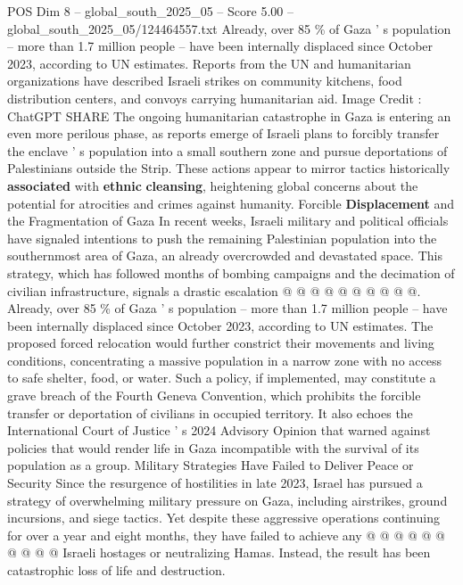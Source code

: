 \begin{textsample}{POS Dim 8 – global\_south\_2025\_05 – Score 5.00 – global\_south\_2025\_05/124464557.txt}  \label{ex:f8_pos_138}
Already, over 85 \% of Gaza ' s population -- more than 1.7 million people -- have been internally displaced since October 2023, according to UN estimates.
Reports from the UN and humanitarian organizations have described Israeli strikes on community kitchens, food distribution centers, and convoys carrying humanitarian aid.
Image Credit : ChatGPT SHARE The ongoing humanitarian catastrophe in Gaza is entering an even more perilous phase, as reports emerge of Israeli plans to forcibly transfer the enclave ' s population into a small southern zone and pursue deportations of Palestinians outside the Strip.
These actions appear to mirror tactics historically \textbf{associated} with \textbf{ethnic} \textbf{cleansing}, heightening global concerns about the potential for atrocities and crimes against humanity.
Forcible \textbf{Displacement} and the Fragmentation of Gaza In recent weeks, Israeli military and political officials have signaled intentions to push the remaining Palestinian population into the southernmost area of Gaza, an already overcrowded and devastated space.
This strategy, which has followed months of bombing campaigns and the decimation of civilian infrastructure, signals a drastic escalation @ @ @ @ @ @ @ @ @ @.
Already, over 85 \% of Gaza ' s population -- more than 1.7 million people -- have been internally displaced since October 2023, according to UN estimates.
The proposed forced relocation would further constrict their movements and living conditions, concentrating a massive population in a narrow zone with no access to safe shelter, food, or water.
Such a policy, if implemented, may constitute a grave breach of the Fourth Geneva Convention, which prohibits the forcible transfer or deportation of civilians in occupied territory.
It also echoes the International Court of Justice ' s 2024 Advisory Opinion that warned against policies that would render life in Gaza incompatible with the survival of its population as a group.
Military Strategies Have Failed to Deliver Peace or Security Since the resurgence of hostilities in late 2023, Israel has pursued a strategy of overwhelming military pressure on Gaza, including airstrikes, ground incursions, and siege tactics.
Yet despite these aggressive operations continuing for over a year and eight months, they have failed to achieve any @ @ @ @ @ @ @ @ @ @ Israeli hostages or neutralizing Hamas.
Instead, the result has been catastrophic loss of life and destruction.

\end{textsample}
